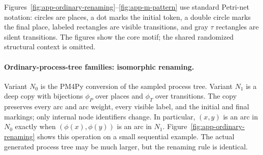 \documentclass[manuscript,screen,nonacm]{acmart}
\begin{document}
Figures~\ref{fig:app-ordinary-renaming}--\ref{fig:app-m-pattern} use standard
Petri-net notation: circles are places, a dot marks the initial token, a double
circle marks the final place, labeled rectangles are visible transitions, and
gray $\tau$ rectangles are silent transitions. The figures show the core motif;
the shared randomized structural context is omitted.


\paragraph{Ordinary-process-tree families: isomorphic renaming.}
Variant $N_0$ is the PM4Py conversion of the sampled process tree. Variant
$N_1$ is a deep copy with bijections $\phi_P$ over places and $\phi_T$ over
transitions. The copy preserves every arc and arc weight, every visible label,
and the initial and final markings; only internal node identifiers change. In
particular, $(x,y)$ is an arc in $N_0$ exactly when
$(\phi(x),\phi(y))$ is an arc in $N_1$. Figure~\ref{fig:app-ordinary-renaming}
shows this operation on a small sequential example. The actual generated
process tree may be much larger, but the renaming rule is identical.
\end{document}
